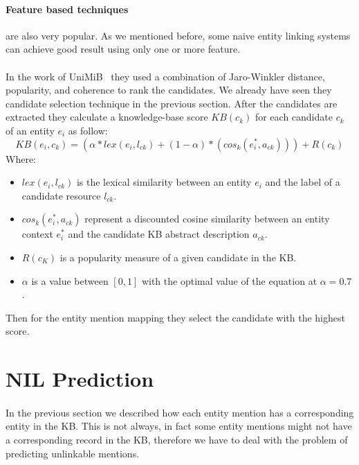 \paragraph{Feature based techniques} are also very popular. As we mentioned before, some naive entity linking systems can achieve good result using only one or more feature.
\paragraph{} In the work of UniMiB~\cite{caliano2016unimib} they used a combination of Jaro-Winkler distance, popularity, and  coherence to rank the candidates. We already have seen they candidate selection technique in the previous section. After the candidates are extracted they calculate a knowledge-base score $KB(c_k)$ for each candidate $c_k$ of an entity $e_i$ as follow: 
\begin{equation}
KB(e_i, c_k) = (\alpha * lex(e_i, l_{ck}) + (1 - \alpha) * (cos_k(e^{*}_{i}, a_{ck}))) + R(c_k)
\end{equation}
Where:

\begin{itemize}[noitemsep,  topsep=10pt]
\item $lex(e_i, l_{ck})$ is the lexical similarity between an entity $e_i$ and the label of a candidate resource $l_{ck}$.
\item $cos_k(e^{*}_{i}, a_{ck})$ represent a discounted cosine similarity between an entity context $e^{*}_{i}$ and the candidate KB abstract description $a_{ck}$.
\item $R(c_K)$ is a popularity measure of a given candidate in the KB.
\item $\alpha$ is a value between $[0, 1]$ with the optimal value of the equation at $\alpha = 0.7$.
\end{itemize}

Then for the entity mention mapping they select the candidate with the highest score.

\section{NIL Prediction}
\paragraph{}
In the previous section we described how each entity mention has a corresponding entity in the KB. This is not always, in fact some entity mentions might not have a corresponding record in the KB, therefore we have to deal with the problem of predicting unlinkable mentions.
